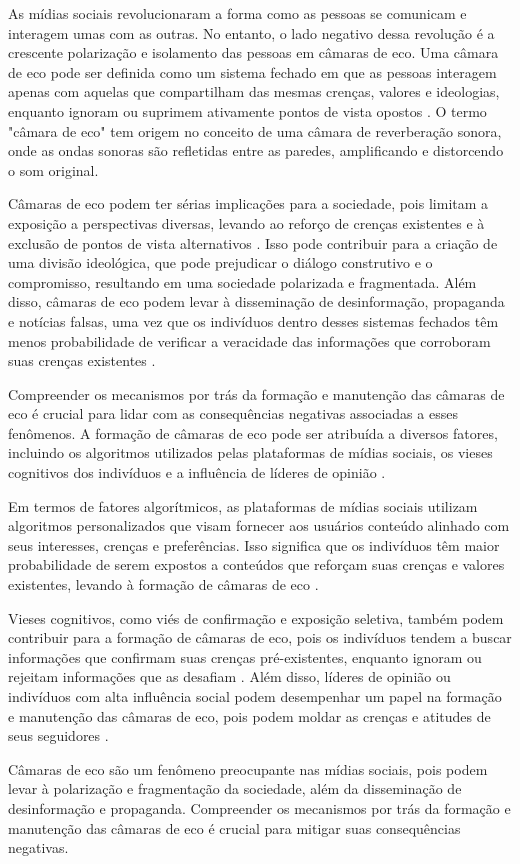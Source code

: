 As mídias sociais revolucionaram a forma como as pessoas se comunicam e interagem umas com as outras. No entanto, o lado negativo dessa revolução é a crescente polarização e isolamento das pessoas em câmaras de eco. Uma câmara de eco pode ser definida como um sistema fechado em que as pessoas interagem apenas com aquelas que compartilham das mesmas crenças, valores e ideologias, enquanto ignoram ou suprimem ativamente pontos de vista opostos \cite[]{2015_Bakshy}. O termo "câmara de eco" tem origem no conceito de uma câmara de reverberação sonora, onde as ondas sonoras são refletidas entre as paredes, amplificando e distorcendo o som original.

Câmaras de eco podem ter sérias implicações para a sociedade, pois limitam a exposição a perspectivas diversas, levando ao reforço de crenças existentes e à exclusão de pontos de vista alternativos \cite[]{2001_Sunstein_BOOK}. Isso pode contribuir para a criação de uma divisão ideológica, que pode prejudicar o diálogo construtivo e o compromisso, resultando em uma sociedade polarizada e fragmentada. Além disso, câmaras de eco podem levar à disseminação de desinformação, propaganda e notícias falsas, uma vez que os indivíduos dentro desses sistemas fechados têm menos probabilidade de verificar a veracidade das informações que corroboram suas crenças existentes \cite[]{2016_Vicario}.

Compreender os mecanismos por trás da formação e manutenção das câmaras de eco é crucial para lidar com as consequências negativas associadas a esses fenômenos. A formação de câmaras de eco pode ser atribuída a diversos fatores, incluindo os algoritmos utilizados pelas plataformas de mídias sociais, os vieses cognitivos dos indivíduos e a influência de líderes de opinião \cite[]{2016_Flaxman}.

Em termos de fatores algorítmicos, as plataformas de mídias sociais utilizam algoritmos personalizados que visam fornecer aos usuários conteúdo alinhado com seus interesses, crenças e preferências. Isso significa que os indivíduos têm maior probabilidade de serem expostos a conteúdos que reforçam suas crenças e valores existentes, levando à formação de câmaras de eco \cite[]{2015_Bakshy}.

Vieses cognitivos, como viés de confirmação e exposição seletiva, também podem contribuir para a formação de câmaras de eco, pois os indivíduos tendem a buscar informações que confirmam suas crenças pré-existentes, enquanto ignoram ou rejeitam informações que as desafiam \cite[]{2006_Taber}. Além disso, líderes de opinião ou indivíduos com alta influência social podem desempenhar um papel na formação e manutenção das câmaras de eco, pois podem moldar as crenças e atitudes de seus seguidores \cite[]{2015_Bakshy}.

Câmaras de eco são um fenômeno preocupante nas mídias sociais, pois podem levar à polarização e fragmentação da sociedade, além da disseminação de desinformação e propaganda. Compreender os mecanismos por trás da formação e manutenção das câmaras de eco é crucial para mitigar suas consequências negativas.